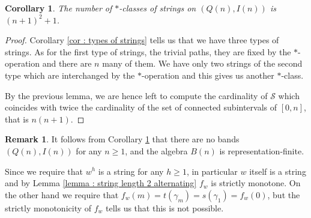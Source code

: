 \documentclass[11pt]{amsart}
\newtheorem{proposition}[theorem]{Proposition}
\newtheorem{corollary}[theorem]{Corollary}
\theoremstyle{definition}
\newtheorem{remark}[theorem]{Remark}
\begin{document}
\begin{corollary}\label{cor : number of *classes of strings}
    The number of $*$-classes of strings on $(Q(n), I(n))$ is $(n+1)^2+1$.
\end{corollary}
\begin{proof}
Corollary \ref{cor : types of strings} tells us that we have three types of strings. As for the first type of strings, the trivial paths, they are fixed by the $*$-operation and there are $n$ many of them. We have only two strings of the second type which are interchanged by the $*$-operation and this gives us another $*$-class.
    
By the previous lemma, we are hence left to compute the cardinality of $\mathscr{S}$ which coincides with twice the cardinality of the set of connected subintervals of $[0,n]$, that is $n(n+1)$.
\end{proof}

\begin{remark} \label{proposition : no bands}
It follows from Corollary \ref{cor : number of *classes of strings} that there are no bands $(Q(n), I(n))$ for any $n\geq 1$, and the
algebra $B(n)$ is representation-finite. 
\end{remark}


    

    Since we require that $w^h$ is a string for any $h\geq 1$, in particular $w$ itself is a string and by Lemma \ref{lemma : string length 2 alternating} $f_w$ is strictly monotone. On the other hand we require that $f_w(m)=t(\gamma_m)=s(\gamma_1)=f_w(0)$, but the strictly monotonicity of $f_w$ tells us that this is not possible.
\end{document}
